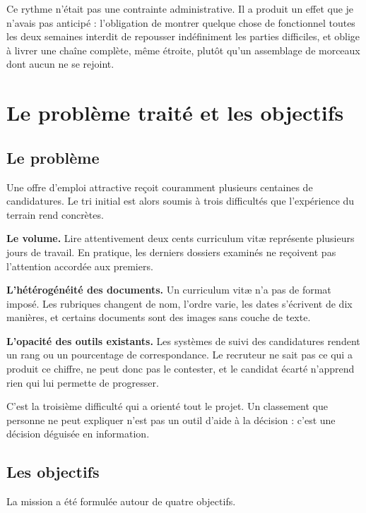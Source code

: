 \documentclass[12pt,a4paper]{report}
\begin{document}
Ce rythme n'était pas une contrainte administrative. Il a produit un effet que
je n'avais pas anticipé : l'obligation de montrer quelque chose de fonctionnel
toutes les deux semaines interdit de repousser indéfiniment les parties
difficiles, et oblige à livrer une chaîne complète, même étroite, plutôt qu'un
assemblage de morceaux dont aucun ne se rejoint.

\chapter{Le problème traité et les objectifs}

\section{Le problème}

Une offre d'emploi attractive reçoit couramment plusieurs centaines de
candidatures. Le tri initial est alors soumis à trois difficultés que
l'expérience du terrain rend concrètes.

\textbf{Le volume.} Lire attentivement deux cents curriculum vitæ représente
plusieurs jours de travail. En pratique, les derniers dossiers examinés ne
reçoivent pas l'attention accordée aux premiers.

\textbf{L'hétérogénéité des documents.} Un curriculum vitæ n'a pas de format
imposé. Les rubriques changent de nom, l'ordre varie, les dates s'écrivent de
dix manières, et certains documents sont des images sans couche de texte.

\textbf{L'opacité des outils existants.} Les systèmes de suivi des
candidatures rendent un rang ou un pourcentage de correspondance. Le recruteur
ne sait pas ce qui a produit ce chiffre, ne peut donc pas le contester, et le
candidat écarté n'apprend rien qui lui permette de progresser.

C'est la troisième difficulté qui a orienté tout le projet. Un classement que
personne ne peut expliquer n'est pas un outil d'aide à la décision : c'est une
décision déguisée en information.

\section{Les objectifs}

La mission a été formulée autour de quatre objectifs.
\end{document}

